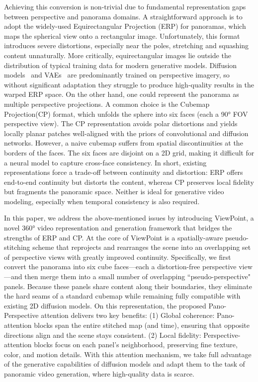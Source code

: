Achieving this conversion is non-trivial due to fundamental representation gaps between perspective and panorama domains. A straightforward approach is to adopt the widely-used Equirectangular Projection (ERP) for panoramas, which maps the spherical view onto a rectangular image.
%
Unfortunately, this format introduces severe distortions, especially near the poles, stretching and squashing content unnaturally. More critically, equirectangular images lie outside the distribution of typical training data for modern generative models. Diffusion models~\cite{ho2020denoising, rombach2022high,song2021denoising} and VAEs~\cite{kingma2013auto} are predominantly trained on perspective imagery, so without significant adaptation they struggle to produce high-quality results in the warped ERP space.
%
On the other hand, one could represent the panorama as multiple perspective projections. A common choice is the Cubemap Projection(CP) format, which unfolds the sphere into six faces (each a 90° FOV perspective view). The CP representation avoids polar distortions and yields locally planar patches well-aligned with the priors of convolutional and diffusion networks.
%
However, a naive cubemap suffers from spatial discontinuities at the borders of the faces. The six faces are disjoint on a 2D grid, making it difficult for a neural model to capture cross-face consistency. 
%
In short, existing representations force a trade-off between continuity and distortion: ERP offers end-to-end continuity but distorts the content, whereas CP preserves local fidelity but fragments the panoramic space. Neither is ideal for generative video modeling, especially when temporal consistency is also required.

In this paper, we address the above-mentioned issues by introducing ViewPoint, a novel 360° video representation and generation framework that bridges the strengths of ERP and CP. 
%
At the core of ViewPoint is a spatially-aware pseudo-stitching scheme that reprojects and rearranges the scene into an overlapping set of perspective views with greatly improved continuity.
%
Specifically, we first convert the panorama into six cube faces—each a distortion-free perspective view—and then merge them into a small number of overlapping ``pseudo-perspective" panels. 
%
Because these panels share content along their boundaries, they eliminate the hard seams of a standard cubemap while remaining fully compatible with existing 2D diffusion models.
%
On this representation, the proposed Pano-Perspective attention delivers two key benefits: (1) Global coherence: Pano-attention blocks span the entire stitched map (and time), ensuring that opposite directions align and the scene stays consistent. (2) Local fidelity: Perspective-attention blocks focus on each panel’s neighborhood, preserving fine texture, color, and motion details.
%
With this attention mechanism, we take full advantage of the generative capabilities of diffusion models and adapt them to the task of panoramic video generation, where high-quality data is scarce.

